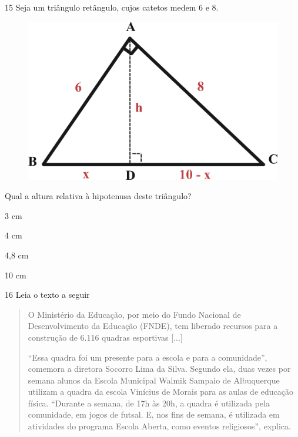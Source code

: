 \pagebreak
\num{15} Seja um triângulo retângulo, cujos catetos medem 6 e 8.

\begin{figure}[htpb!]
\centering
\includegraphics[width=.5\textwidth]{./ilustras-mat/Simulado_2-atividade_15_resposta.png}
\end{figure}

Qual a altura relativa à hipotenusa deste triângulo?

\begin{escolha}

  \item 3 cm

  \item 4 cm

  \item 4,8 cm

  \item 10 cm

\end{escolha}


\num{16} Leia o texto a seguir

\begin{quote}
O Ministério da Educação, por meio do Fundo Nacional de Desenvolvimento
da Educação (FNDE), tem liberado recursos para a construção de 6.116
quadras esportivas {[}...{]}

``Essa quadra foi um presente para a escola e para a comunidade'',
comemora a diretora Socorro Lima da Silva. Segundo ela, duas vezes por
semana alunos da Escola Municipal Walmik Sampaio de Albuquerque utilizam
a quadra da escola Vinícius de Morais para as aulas de educação física.
``Durante a semana, de 17h às 20h, a quadra é utilizada pela comunidade,
em jogos de futsal. E, nos fins de semana, é utilizada em atividades do
programa Escola Aberta, como eventos religiosos'', explica.

\end{quote}

